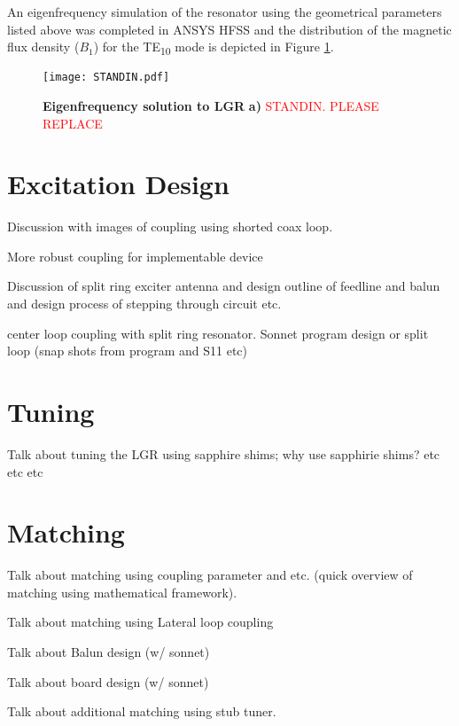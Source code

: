 An eigenfrequency simulation of the resonator using the geometrical parameters listed above was completed in ANSYS HFSS and the distribution of the magnetic flux density ($B_1$) for the TE\textsubscript{10} mode is depicted in Figure \ref{LGR_Eigen}.

\begin{figure}[t!]
\centering
\texttt{[image: STANDIN.pdf]}  
\caption{\textbf{Eigenfrequency solution to LGR} \textbf{a)} \textcolor{red} {STANDIN. PLEASE REPLACE}}
\label{LGR_Eigen}
\end{figure}













\section{Excitation Design}

Discussion with images of coupling using shorted coax loop.

More robust coupling for implementable device

Discussion of split ring exciter antenna and design outline of feedline and balun and design process of stepping through circuit etc.

center loop coupling with split ring resonator. Sonnet program design or split loop (snap shots from program and S11 etc) 

\section{Tuning} \label{tuning}

Talk about tuning the LGR using sapphire shims; why use sapphirie shims? etc etc etc

\section{Matching}

Talk about matching using coupling parameter and etc. (quick overview of matching using mathematical framework).

Talk about matching using Lateral loop coupling

Talk about Balun design (w/ sonnet)

Talk about board design (w/ sonnet)

Talk about additional matching using stub tuner.



